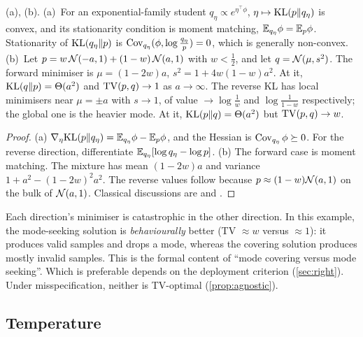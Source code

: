 \begin{proposition}\label{prop:projections}
\Pv(a), \Kn(b).
(a)~For an exponential-family student $q_\eta\propto e^{\eta^\top\phi}$, $\eta\mapsto\mathrm{KL}(p\|q_\eta)$ is convex,
and its stationarity condition is moment matching, $\mathbb{E}_{q_\eta}\phi=\mathbb{E}_p\phi$. Stationarity of
$\mathrm{KL}(q_\eta\|p)$ is $\operatorname{Cov}_{q_\eta}(\phi,\log\frac{q_\eta}p)=0$, which is generally non-convex.
(b)~Let $p=w\,\mathcal{N}(-a,1)+(1-w)\,\mathcal{N}(a,1)$ with $w<\frac12$, and let $q=\mathcal{N}(\mu,s^2)$.
The forward minimiser is $\mu=(1-2w)a$, $s^2=1+4w(1-w)a^2$. At it, $\mathrm{KL}(q\|p)=\Theta(a^2)$ and $\mathrm{TV}(p,q)\to1$
as $a\to\infty$.
The reverse KL has local minimisers near $\mu=\pm a$ with $s\to1$, of value $\to\log\frac1w$ and
$\log\frac1{1-w}$ respectively; the global one is the heavier mode. At it, $\mathrm{KL}(p\|q)=\Theta(a^2)$ but
$\mathrm{TV}(p,q)\to w$.
\end{proposition}
\begin{proof}
(a) $\nabla_\eta\mathrm{KL}(p\|q_\eta)=\mathbb{E}_{q_\eta}\phi-\mathbb{E}_p\phi$, and the Hessian is $\operatorname{Cov}_{q_\eta}\phi\succeq0$. For the
reverse direction, differentiate $\mathbb{E}_{q_\eta}[\log q_\eta-\log p]$.
(b) The forward case is moment matching. The mixture has mean $(1-2w)a$ and variance
$1+a^2-(1-2w)^2a^2$. The reverse values follow because $p\approx(1-w)\mathcal{N}(a,1)$ on the bulk of
$\mathcal{N}(a,1)$. Classical discussions are \citet{minka2005divergence} and \citet{bishop2006pattern}.
\end{proof}
\noindent
Each direction's minimiser is catastrophic in the other direction. In this example, the mode-seeking
solution is \emph{behaviourally} better (TV $\approx w$ versus $\approx1$): it produces valid samples and
drops a mode, whereas the covering solution produces mostly invalid samples. This is the formal content
of ``mode covering versus mode seeking''. Which is preferable depends on the deployment criterion
(\cref{sec:right}). Under misspecification, neither is TV-optimal (\cref{prop:agnostic}).

\subsection{Temperature}

